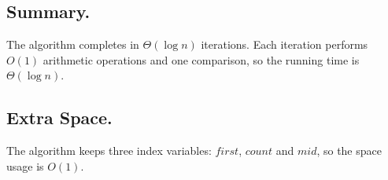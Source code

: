 \documentclass[12pt]{article}
\begin{document}
\subsection*{Summary.}
The algorithm completes in \(\Theta(\log n)\) iterations. Each iteration performs \(O(1)\) arithmetic operations and one comparison, so the running time is \(\Theta(\log n)\).

\subsection*{Extra Space.}
The algorithm keeps three index variables: \(first\), \(count\) and \(mid\), so the space usage is \(O(1)\).
\end{document}
